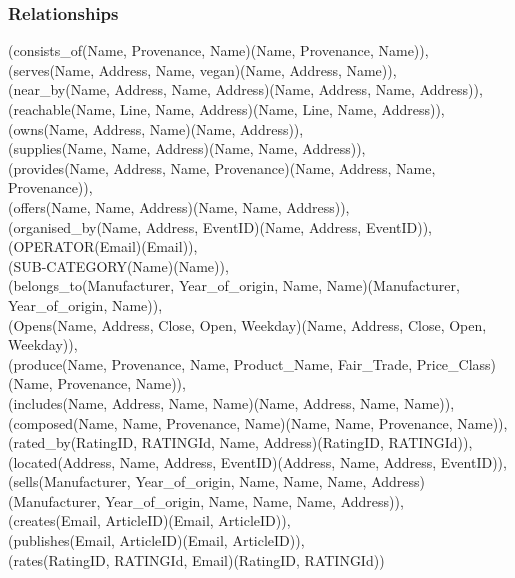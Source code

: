 {\subsubsection{Relationships}
(consists\_of(Name, Provenance, Name)(Name, Provenance, Name)),  \\
(serves(Name, Address, Name, vegan)(Name, Address, Name)), \\
(near\_by(Name, Address, Name, Address)(Name, Address, Name, Address)), \\
(reachable(Name, Line, Name, Address)(Name, Line, Name, Address)), \\
(owns(Name, Address, Name)(Name, Address)), \\
(supplies(Name, Name, Address)(Name, Name, Address)), \\
(provides(Name, Address, Name, Provenance)(Name, Address, Name, Provenance)), \\
(offers(Name, Name, Address)(Name, Name, Address)), \\
(organised\_by(Name, Address, EventID)(Name, Address, EventID)), \\
(OPERATOR(Email)(Email)), \\
(SUB-CATEGORY(Name)(Name)), \\
(belongs\_to(Manufacturer, Year\_of\_origin, Name, Name)(Manufacturer, Year\_of\_origin, Name)), \\
(Opens(Name, Address, Close, Open, Weekday)(Name, Address, Close, Open, Weekday)), \\
(produce(Name, Provenance, Name, Product\_Name, Fair\_Trade, Price\_Class)(Name, Provenance, Name)), \\
(includes(Name, Address, Name, Name)(Name, Address, Name, Name)), \\
(composed(Name, Name, Provenance, Name)(Name, Name, Provenance, Name)), \\
(rated\_by(RatingID, RATINGId, Name, Address)(RatingID, RATINGId)), \\
(located(Address, Name, Address, EventID)(Address, Name, Address, EventID)), \\
(sells(Manufacturer, Year\_of\_origin, Name, Name, Name, Address)(Manufacturer, Year\_of\_origin, Name, Name, Name, Address)), \\
(creates(Email, ArticleID)(Email, ArticleID)), \\
(publishes(Email, ArticleID)(Email, ArticleID)), \\
(rates(RatingID, RATINGId, Email)(RatingID, RATINGId))
}
